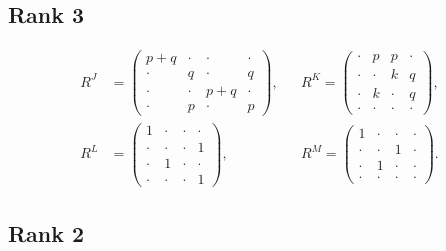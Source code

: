 \documentclass{article}
\begin{document}
\subsection{Rank 3} 
\begin{align}
   R^J&=\begin{pmatrix}
        p+q&\cdot&\cdot&\cdot\\
        \cdot&q&\cdot&q\\
        \cdot&\cdot &p+q&\cdot\\
        \cdot&p &\cdot&p
    \end{pmatrix},
&&   R^K = \begin{pmatrix}
        \cdot&p&p&\cdot \\
        \cdot&\cdot&k&q\\
        \cdot&k&\cdot&q\\
        \cdot&\cdot&\cdot&\cdot
    \end{pmatrix},
\\    
   R^L&= \begin{pmatrix}
        1&\cdot&\cdot&\cdot\\
        \cdot&\cdot&\cdot&1\\
        \cdot&1&\cdot&\cdot\\
        \cdot&\cdot&\cdot&1
    \end{pmatrix},
&&     R^M= \begin{pmatrix}
        1&\cdot&\cdot&\cdot\\
        \cdot&\cdot &1&\cdot\\
        \cdot&1&\cdot &\cdot\\
        \cdot&\cdot&\cdot&\cdot
    \end{pmatrix}.
\end{align}

\subsection{Rank 2} 
\end{document}
